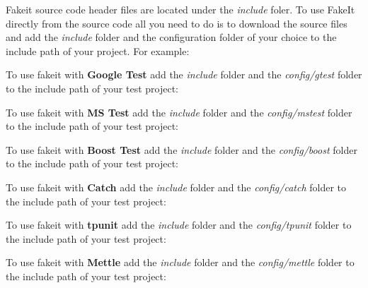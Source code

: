 Fakeit source code header files are located under the {\itshape include} foler. To use Fake\+It directly from the source code all you need to do is to download the source files and add the {\itshape include} folder and the configuration folder of your choice to the include path of your project. For example\+:
\begin{DoxyItemize}
\item To use fakeit with {\bfseries{Google Test}} add the {\itshape include} folder and the {\itshape config/gtest} folder to the include path of your test project\+: 
\begin{DoxyCode}{0}
\end{DoxyCode}

\item To use fakeit with {\bfseries{MS Test}} add the {\itshape include} folder and the {\itshape config/mstest} folder to the include path of your test project\+: 
\begin{DoxyCode}{0}
\end{DoxyCode}

\item To use fakeit with {\bfseries{Boost Test}} add the {\itshape include} folder and the {\itshape config/boost} folder to the include path of your test project\+: 
\begin{DoxyCode}{0}
\end{DoxyCode}

\item To use fakeit with {\bfseries{Catch}} add the {\itshape include} folder and the {\itshape config/catch} folder to the include path of your test project\+: 
\begin{DoxyCode}{0}
\end{DoxyCode}

\item To use fakeit with {\bfseries{tpunit}} add the {\itshape include} folder and the {\itshape config/tpunit} folder to the include path of your test project\+: 
\begin{DoxyCode}{0}
\end{DoxyCode}

\item To use fakeit with {\bfseries{Mettle}} add the {\itshape include} folder and the {\itshape config/mettle} folder to the include path of your test project\+: 
\begin{DoxyCode}{0}
\end{DoxyCode}


\end{DoxyItemize}
